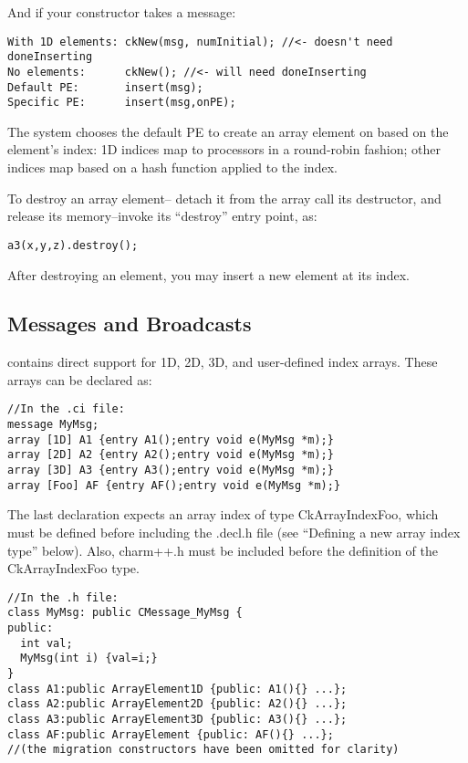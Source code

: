 And if your constructor takes a message:
\begin{verbatim}
With 1D elements: ckNew(msg, numInitial); //<- doesn't need doneInserting
No elements:      ckNew(); //<- will need doneInserting
Default PE:       insert(msg);
Specific PE:      insert(msg,onPE);
\end{verbatim}

The system chooses the default PE to create an array element on
based on the element's index: 1D indices map to processors in
a round-robin fashion; other indices map based on a hash function
applied to the index.

To destroy an array element-- detach it from the array
call its destructor, and release its memory--invoke its ``destroy'' 
entry point, as:
\begin{verbatim}
a3(x,y,z).destroy();
\end{verbatim}

After destroying an element, you may insert a new element at
its index.


\subsection{Messages and Broadcasts}

\charmpp contains direct support for 1D, 2D, 3D, and user-defined
index arrays.  These arrays can be declared as:

\begin{verbatim}
//In the .ci file:
message MyMsg;
array [1D] A1 {entry A1();entry void e(MyMsg *m);}
array [2D] A2 {entry A2();entry void e(MyMsg *m);}
array [3D] A3 {entry A3();entry void e(MyMsg *m);}
array [Foo] AF {entry AF();entry void e(MyMsg *m);}
\end{verbatim}

The last declaration expects an array index of type CkArrayIndexFoo,
which must be defined before including the .decl.h file 
(see ``Defining a new array index type'' below).  Also, charm++.h must be included before the definition of the CkArrayIndexFoo type. 

\begin{verbatim}
//In the .h file:
class MyMsg: public CMessage_MyMsg {
public: 
  int val;
  MyMsg(int i) {val=i;}
}
class A1:public ArrayElement1D {public: A1(){} ...};
class A2:public ArrayElement2D {public: A2(){} ...};
class A3:public ArrayElement3D {public: A3(){} ...};
class AF:public ArrayElement {public: AF(){} ...};
//(the migration constructors have been omitted for clarity)
\end{verbatim}

